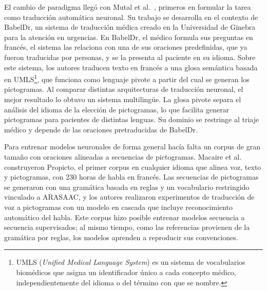 El cambio de paradigma llegó con Mutal et al.\ \cite{mutal2022}, primeros en formular la tarea como traducción automática neuronal. Su trabajo se desarrolla en el contexto de BabelDr, un sistema de traducción médica creado en la Universidad de Ginebra para la atención en urgencias. En BabelDr, el médico formula sus preguntas en francés, el sistema las relaciona con una de sus oraciones predefinidas, que ya fueron traducidas por personas, y se la presenta al paciente en su idioma. Sobre este sistema, los autores traducen texto en francés a una glosa semántica basada en UMLS\footnote{UMLS (\textit{Unified Medical Language System}) es un sistema de vocabularios biomédicos que asigna un identificador único a cada concepto médico, independientemente del idioma o del término con que se nombre.}, que funciona como lenguaje pivote a partir del cual se generan los pictogramas. Al comparar distintas arquitecturas de traducción neuronal, el mejor resultado lo obtuvo un sistema multilingüe. La glosa pivote separa el análisis del idioma de la elección de pictogramas, lo que facilita generar pictogramas para pacientes de distintas lenguas. Su dominio se restringe al triaje médico y depende de las oraciones pretraducidas de BabelDr.

Para entrenar modelos neuronales de forma general hacía falta un corpus de gran tamaño con oraciones alineadas a secuencias de pictogramas. Macaire et al.\ \cite{macaire2024} construyeron Propicto, el primer corpus en cualquier idioma que alinea voz, texto y pictogramas, con 230 horas de habla en francés. Las secuencias de pictogramas se generaron con una gramática basada en reglas y un vocabulario restringido vinculado a ARASAAC, y los autores realizaron experimentos de traducción de voz a pictogramas con un modelo en cascada que incluye reconocimiento automático del habla. Este corpus hizo posible entrenar modelos secuencia a secuencia supervisados; al mismo tiempo, como las referencias provienen de la gramática por reglas, los modelos aprenden a reproducir sus convenciones.


